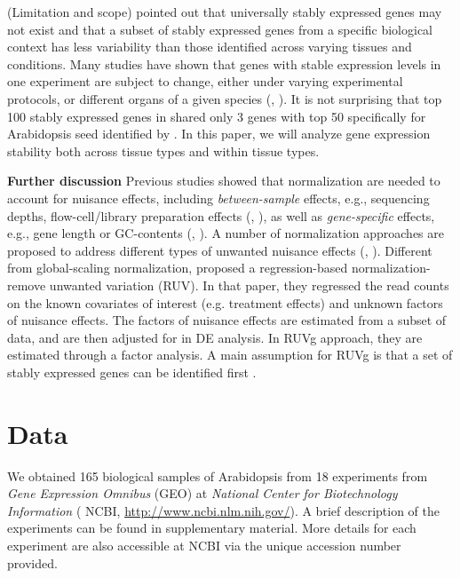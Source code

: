 \documentclass[11pt, a4paper]{article}
\begin{document}
(Limitation and scope) \cite{hruz2011refgenes} pointed out that universally
stably expressed genes may not exist and that a subset of stably expressed
genes from a specific biological context has less variability than those
identified across varying tissues and conditions. Many studies have shown that
genes with stable expression levels  in one experiment are subject to change,
either under varying experimental protocols, or different organs of a given
species (\cite{reid2006optimized}, \cite{hong2010identification}).  It is not
surprising that top 100 stably expressed genes in \cite{czechowski2005genome} shared only 3 genes with top 50  specifically for Arabidopsis seed identified by \cite{dekkers2012identification}.
In this paper, we will analyze gene expression stability both across tissue types
and within tissue types.


{\bf Further discussion} Previous studies showed that normalization are needed
to account for nuisance effects, including \textit{between-sample} effects,
e.g., sequencing depths, flow-cell/library preparation effects
(\cite{bullard2010evaluation}, \cite{robinson2010scaling}), as well as
\textit{gene-specific} effects, e.g.,  gene length or GC-contents
(\cite{risso2011gc}, \cite{hansen2012removing}). A number of normalization
approaches are proposed to address different types of unwanted nuisance
effects (\cite{dillies2013comprehensive}, \cite{risso2014nat}). Different from
global-scaling normalization, \cite{risso2014nat}  proposed a regression-based
normalization-remove unwanted variation (RUV).  In that paper, they regressed
the read counts on the known covariates of interest (e.g. treatment effects)
and unknown factors of nuisance effects. The factors of nuisance effects are
estimated from a subset of data, and are then adjusted for in DE analysis. In
RUVg approach, they are estimated through a factor analysis. A main assumption
for RUVg is that a set of stably expressed genes can be identified first
.

\section{Data}
 We obtained 165 biological samples of Arabidopsis  from 18 experiments from \textit{Gene Expression Omnibus} (GEO) at \textit{National Center for Biotechnology Information}  ( NCBI, \url{http://www.ncbi.nlm.nih.gov/}).  A brief description of the experiments can be found in supplementary material. More details for each experiment are also accessible at NCBI via the unique accession number provided.
 
\end{document}
